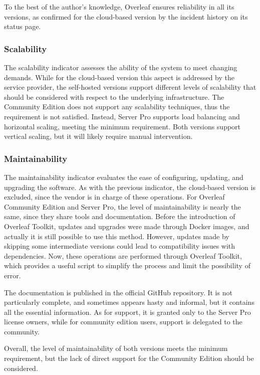 To the best of the author's knowledge, Overleaf ensures reliability in all its versions, as confirmed for the cloud-based version by the incident history on its status page. 

\subsubsection{Scalability}
The scalability indicator assesses the ability of the system to meet changing demands. While for the cloud-based version this aspect is addressed by the service provider, the self-hosted versions support different levels of scalability that should be considered with respect to the underlying infrastructure. The Community Edition does not support any scalability techniques, thus the requirement is not satisfied. Instead, Server Pro supports load balancing and horizontal scaling, meeting the minimum requirement. Both versions support vertical scaling, but it will likely require manual intervention.

\subsubsection{Maintainability}
The maintainability indicator evaluates the ease of configuring, updating, and upgrading the software. As with the previous indicator, the cloud-based version is excluded, since the vendor is in charge of these operations. For Overleaf Community Edition and Server Pro, the level of maintainability is nearly the same, since they share tools and documentation. Before the introduction of Overleaf Toolkit, updates and upgrades were made through Docker images, and actually it is still possible to use this method. However, updates made by skipping some intermediate versions could lead to compatibility issues with dependencies. Now, these operations are performed through Overleaf Toolkit, which provides a useful script to simplify the process and limit the possibility of error.

The documentation is published in the official GitHub repository. It is not particularly complete, and sometimes appears hasty and informal, but it contains all the essential information. As for support, it is granted only to the Server Pro license owners, while for community edition users, support is delegated to the community.

Overall, the level of maintainability of both versions meets the minimum requirement, but the lack of direct support for the Community Edition should be considered. 

